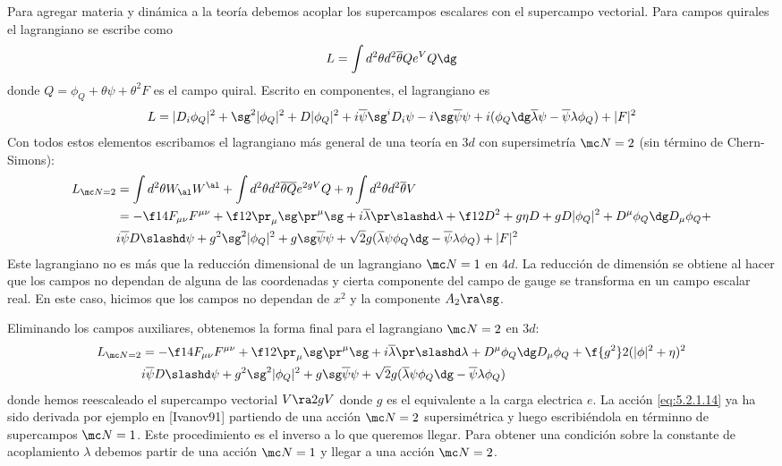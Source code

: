 Para agregar materia y dinámica a la teoría debemos acoplar los supercampos escalares con el supercampo vectorial. Para campos quirales el lagrangiano se escribe como
\begin{align}
	L = \int d^2\theta d^2\overline\theta Q e^{V}Q\dg
\end{align}
donde $Q = \phi_Q+\theta\psi+\theta^2 F$ es el campo quiral. Escrito en componentes, el lagrangiano es
\begin{align}
	L = |D_i\phi_Q|^2+\sg^2|\phi_Q|^2+D|\phi_Q|^2+i\overline\psi\sg^iD_i\psi-i\sg\overline\psi\psi+i(\phi_Q\dg\overline\lambda\psi-\overline\psi\lambda\phi_Q)+|F|^2
\end{align}
Con todos estos elementos escribamos el lagrangiano más general de una teoría en $3d$ con supersimetría $\mc N=2$ (sin término de Chern-Simons):
\begin{align}
	L_{\mc N=2} &= \int d^2\theta W_\al W^\al+\int d^2\theta d^2\overline\theta\overline Qe^{2gV}Q+\eta\int d^2\theta d^2\overline\theta V\\
	&= -\f 14 F_{\mu\nu}F^{\mu\nu}+\f 12\pr_\mu\sg\pr^\mu\sg+i\overline\lambda\pr\slashd\lambda+\f 12D^2+g\eta D+gD|\phi_Q|^2+D^\mu\phi_Q\dg D_\mu\phi_Q+\nonumber\\
	&i\overline\psi D\slashd\psi+g^2\sg^2|\phi_Q|^2+g\sg\overline\psi\psi+\sqrt{2}g(\overline\lambda\psi\phi_Q\dg-\overline\psi\lambda\phi_Q)+|F|^2
\end{align}
Este lagrangiano no es más que la reducción dimensional de un lagrangiano $\mc N=1$ en $4d$. La reducción de dimensión se obtiene al hacer que los campos no dependan de alguna de las coordenadas y cierta componente del campo de gauge se transforma en un campo escalar real. En este caso, hicimos que los campos no dependan de $x^2$ y la componente $A_2\ra \sg$.

Eliminando los campos auxiliares, obtenemos la forma final para el lagrangiano $\mc N=2$ en $3d$:
\begin{align}
	L_{\mc N=2} &= -\f 14 F_{\mu\nu}F^{\mu\nu}+\f 12\pr_\mu\sg\pr^\mu\sg+i\overline\lambda\pr\slashd\lambda+D^\mu\phi_Q\dg D_\mu\phi_Q+\f{g^2}2(|\phi|^2+\eta)^2\nonumber\\
	&i\overline\psi D\slashd\psi+g^2\sg^2|\phi_Q|^2+g\sg\overline\psi\psi+\sqrt{2}g(\overline\lambda\psi\phi_Q\dg-\overline\psi\lambda\phi_Q) \label{eq:5.2.1.14}
\end{align}
donde hemos reescaleado el supercampo vectorial $V\ra 2gV$ donde $g$ es el equivalente a la carga electrica $e$. La acción \eqref{eq:5.2.1.14} ya ha sido derivada por ejemplo en [Ivanov91] partiendo de una acción $\mc N=2$ supersimétrica y luego escribiéndola en términno de supercampos $\mc N=1$. Este procedimiento es el inverso a lo que queremos llegar. Para obtener una condición sobre la constante de acoplamiento $\lambda$ debemos partir de una acción $\mc N=1$ y llegar a una acción $\mc N=2$.


